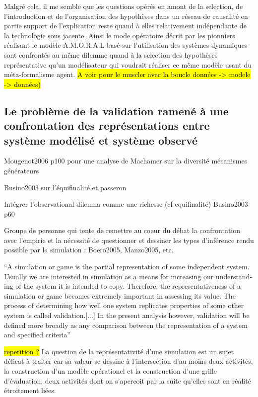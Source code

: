 Malgré cela, il me semble que les questions opérés en amont de la selection, de l'introduction et de l'organisation des hypothèses dans un réseau de causalité en partie support de l'explication reste quand à elles relativement indépendante de la technologie sous jacente. Ainsi le mode opératoire décrit par les pionniers réalisant le modèle A.M.O.R.A.L basé sur l'utilisation des systèmes dynamiques sont confrontés au même dilemme quand à la selection des hypothèses représentative qu'un modélisateur qui voudrait réaliser ce même modèle usant du méta-formalisme agent. \hl{A voir pour le muscler avec la boucle données -> modele -> données)}

\subsection{Le problème de la validation ramené à une confrontation des représentations entre système modélisé et système observé}
\label{ssec:confrontation_sysmodelise_sysobserve}

Mougenot2006 p100 pour une analyse de Machamer sur la diversité mécanismes générateurs

Busino2003 sur l'équifinalité et passeron

Intégrer l'observational dilemna comme une richesse (cf equifinalité) Busino2003 p60

Groupe de personne qui tente de remettre au coeur du débat la confrontation avec l'empirie et la nécessité de questionner et dessiner les types d'inférence rendu possible par la simulation : Boero2005, Manzo2005, etc.

\foreignquote{english}{A simulation or game is the partial representation of some independent system. Usually we are interested in simulation as a means for increasing our understanding of the system it is intended to copy. Therefore, the representativeness of a simulation or game becomes extremely important in assessing its value. The process of determining how well one system replicates properties of some other system is called validation.[...] In the present analysis however, validation will be defined more broadly as any comparison between the representation of a system and specified criteria} \autocite[216]{Hermann1967}

\hl{repetition ?}
La question de la représentativité d'une simulation est un sujet délicat à traiter car sa valeur se dessine à l'intersection d'au moins deux activités, la construction d'un modèle opérationel et la construction d'une grille d'évaluation, deux activités dont on s'apercoit par la suite qu'elles sont en réalité étroitement liées. 

